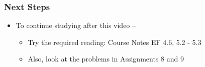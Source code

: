 \documentclass[10pt,english,aspectratio=169]{beamer}
\begin{document}
\begin{frame} \frametitle{Next Steps}

\begin{itemize}
\setlength\itemsep{5mm}
\item To continue studying after this video -- \vspace{2mm}

\begin{itemize}
 \setlength\itemsep{3mm}
 
 \item Try the required reading:  Course Notes EF 4.6, 5.2 - 5.3

 \item Also, look at the problems in Assignments 8 and 9
\end{itemize}
\end{itemize}


\end{frame}
\end{document}

